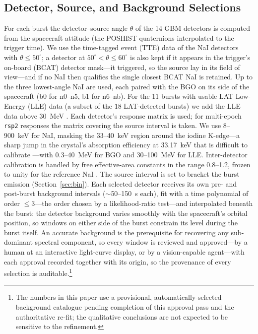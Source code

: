 \documentclass[twocolumn]{aastex631}
\begin{document}
\subsection{Detector, Source, and Background Selections} \label{sec:bkg}
For each burst the detector--source angle $\theta$ of the 14 GBM detectors is
computed from the spacecraft attitude (the POSHIST quaternions interpolated to
the trigger time). We use the time-tagged event (TTE) data of the NaI detectors
with $\theta\le50^\circ$; a detector at $50^\circ<\theta\le60^\circ$ is also kept
if it appears in the trigger's on-board (BCAT) detector mask---it triggered, so
the source lay in its field of view---and if no NaI then qualifies the single
closest BCAT NaI is retained. Up to the three lowest-angle NaI are used, each
paired with the BGO on its side of the spacecraft (b0 for n0--n5, b1 for
n6--nb). For the $11$ bursts with usable LAT Low-Energy (LLE) data (a subset of
the $18$ LAT-detected bursts) we add the LLE data above 30~MeV
\citep{Atwood2009}. Each detector's response matrix is used; for multi-epoch
\texttt{rsp2} responses the matrix covering the source interval is taken. We use 8--900~keV for NaI, masking the 33--40~keV region around the iodine
K-edge---a sharp jump in the crystal's absorption efficiency at 33.17~keV
that is difficult to calibrate \citep{Ronchi2020}---with 0.3--40~MeV for BGO
and 30--100~MeV for LLE. Inter-detector calibration is handled by free
effective-area constants in the range 0.8--1.2, frozen to unity for the
reference NaI \citep[as in][]{Ronchi2020}. The source interval is set to bracket the burst emission
(Section~\ref{sec:bin}). Each selected detector receives its own pre- and
post-burst background intervals ($\sim$50--150~s each), fit with a time
polynomial of order $\le$3---the order chosen by a likelihood-ratio test---and
interpolated beneath the burst: the detector background varies smoothly with the
spacecraft's orbital position, so windows on either side of the burst constrain
its level during the burst itself. An accurate background is the prerequisite
for recovering any sub-dominant spectral component, so every window is reviewed
and approved---by a human at an interactive light-curve display, or by a
vision-capable agent---with each approval recorded together with its origin, so
the provenance of every selection is auditable.\footnote{The numbers in this
paper use a provisional, automatically-selected background catalogue pending
completion of this approval pass and the authoritative re-fit; the qualitative
conclusions are not expected to be sensitive to the refinement.}
\end{document}
